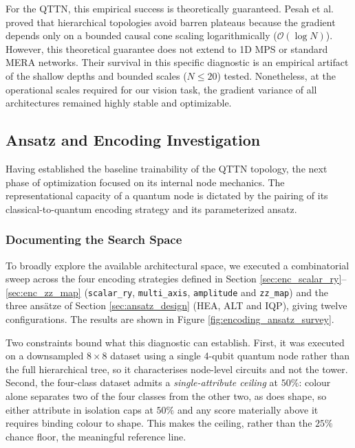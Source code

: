 \documentclass[12pt, a4paper, oneside]{report}
\begin{document}
For the QTTN, this empirical success is theoretically guaranteed. Pesah et al. \cite{pesah2021_qcnn} proved that hierarchical topologies avoid barren plateaus because the gradient depends only on a bounded causal cone scaling logarithmically ($\mathcal{O}(\log N)$). However, this theoretical guarantee does not extend to 1D MPS or standard MERA networks. Their survival in this specific diagnostic is an empirical artifact of the shallow depths and bounded scales ($N \le 20$) tested. Nonetheless, at the operational scales required for our vision task, the gradient variance of all architectures remained highly stable and optimizable.


\subsection{Ansatz and Encoding Investigation}

Having established the baseline trainability of the QTTN topology, the next phase of optimization focused on its internal node mechanics. The representational capacity of a quantum node is dictated by the pairing of its classical-to-quantum encoding strategy and its parameterized ansatz. 

\subsubsection{Documenting the Search Space}
\label{sec:search_space}
To broadly explore the available architectural space, we executed a combinatorial sweep across the four encoding strategies defined in Section \ref{sec:enc_scalar_ry}--\ref{sec:enc_zz_map} (\texttt{scalar\_ry}, \texttt{multi\_axis}, \texttt{amplitude} and \texttt{zz\_map}) and the three ans\"{a}tze of Section \ref{sec:ansatz_design} (HEA, ALT and IQP), giving twelve configurations. The results are shown in Figure \ref{fig:encoding_ansatz_survey}.

Two constraints bound what this diagnostic can establish. First, it was executed on a downsampled $8 \times 8$ dataset using a single 4-qubit quantum node rather than the full hierarchical tree, so it characterises node-level circuits and not the tower. Second, the four-class dataset admits a \textit{single-attribute ceiling} at $50\%$: colour alone separates two of the four classes from the other two, as does shape, so either attribute in isolation caps at $50\%$ and any score materially above it requires binding colour to shape. This makes the ceiling, rather than the $25\%$ chance floor, the meaningful reference line.
\end{document}
